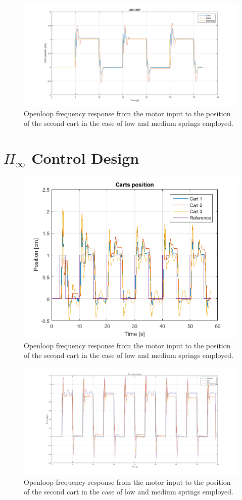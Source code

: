 \begin{figure}[h]
\centering
\includegraphics[width=0.5\linewidth]{img/lqg.png}
\caption{Openloop frequency response from the motor input to the position of the second cart in the case of low and medium springs employed.}
\label{fig:lqg3dof}
\end{figure}
\section{$H_\infty$ Control Design}
\begin{figure}[h]
\centering
\includegraphics[width=0.5\linewidth]{img/hinf1.png}
\caption{Openloop frequency response from the motor input to the position of the second cart in the case of low and medium springs employed.}
\label{fig:hinf13dof}
\end{figure}
\begin{figure}[h]
\centering
\includegraphics[width=0.5\linewidth]{img/hinf2.png}
\caption{Openloop frequency response from the motor input to the position of the second cart in the case of low and medium springs employed.}
\label{fig:hinf23dof}
\end{figure}